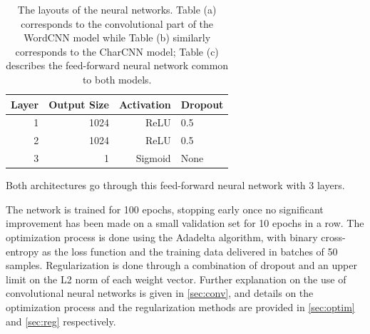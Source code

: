 \begin{table}[tb]
\begin{subtable}[t]{\textwidth}
    \centering
    \begin{tabular}{rrrl}
      \toprule
      Layer & Output Size & Activation & Dropout \\
      \midrule
      1 & 1024 & ReLU & 0.5 \\
      2 & 1024 & ReLU & 0.5 \\
      3 & 1 & Sigmoid & None \\
      \bottomrule
    \end{tabular}
    \caption{Both architectures go through this feed-forward neural network
    with 3 layers.
    \label{tbl:fully_connected}}
  \end{subtable}
  \caption{The layouts of the neural networks. Table (a) corresponds to the
  convolutional part of the WordCNN model while Table (b) similarly corresponds
  to the CharCNN model; Table (c) describes the feed-forward neural network
  common to both models.\label{tbl:conv_layers}}
\end{table}

The network is trained for 100 epochs, stopping early once no significant
improvement has been made on a small validation set for 10 epochs in a row.
The optimization process is done using the Adadelta\citep{adadelta} algorithm,
with binary cross-entropy as the loss function and the training data delivered
in batches of 50 samples. Regularization is done through a combination of
dropout\citep{dropout} and an upper limit on the L2 norm of each weight
vector\citep{l2norm}. Further explanation on the use of convolutional neural
networks is given in \cref{sec:conv}, and details on the optimization process
and the regularization methods are provided in \cref{sec:optim} and
\cref{sec:reg} respectively.


